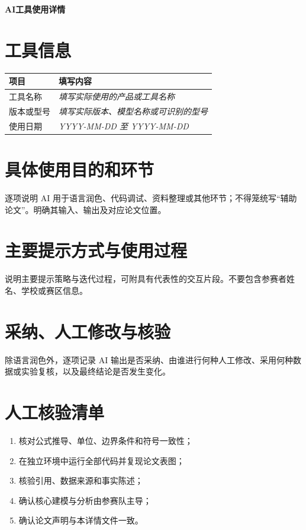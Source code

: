 \documentclass[zihao=-4,a4paper,UTF8,fontset=fandol]{ctexart}
\begin{document}
\thispagestyle{plain}
\begin{center}
  {\heiti{}\bfseries AI工具使用详情}
\end{center}

\section{工具信息}
\noindent
\begin{tabularx}{\textwidth}{@{}p{}Y@{}}
  \toprule
  项目 & 填写内容 \\
  \midrule
  工具名称 & \textit{填写实际使用的产品或工具名称} \\
  版本或型号 & \textit{填写实际版本、模型名称或可识别的型号} \\
  使用日期 & \textit{YYYY-MM-DD 至 YYYY-MM-DD} \\
  \bottomrule
\end{tabularx}

\section{具体使用目的和环节}
逐项说明 AI 用于语言润色、代码调试、资料整理或其他环节；不得笼统写“辅助论文”。明确其输入、输出及对应论文位置。

\section{主要提示方式与使用过程}
说明主要提示策略与迭代过程，可附具有代表性的交互片段。不要包含参赛者姓名、学校或赛区信息。

\section{采纳、人工修改与核验}
除语言润色外，逐项记录 AI 输出是否采纳、由谁进行何种人工修改、采用何种数据或实验复核，以及最终结论是否发生变化。

\section{人工核验清单}
\begin{enumerate}[label=\arabic*)]
  \item 核对公式推导、单位、边界条件和符号一致性；
  \item 在独立环境中运行全部代码并复现论文表图；
  \item 核验引用、数据来源和事实陈述；
  \item 确认核心建模与分析由参赛队主导；
  \item 确认论文声明与本详情文件一致。
\end{enumerate}
\end{document}
